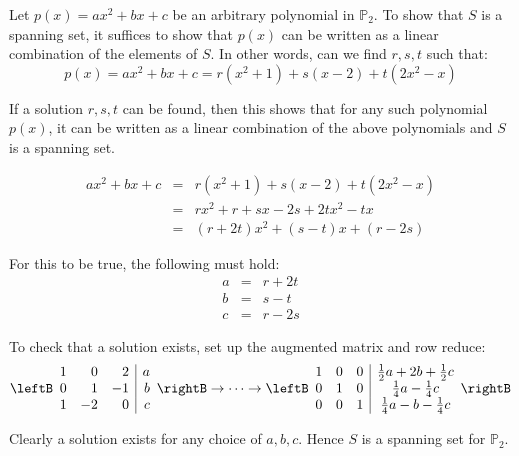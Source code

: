 \begin{solution}
Let $p(x)= ax^2 + bx + c$ be an arbitrary polynomial in $\mathbb{P}_2$. To show that $S$ is a spanning set, it suffices to show that $p(x)$ can be written as a linear combination of the elements of $S$. In other words, can we find $r,s,t$ such that:
\[
p(x) =  ax^2 +bx + c = r(x^2 + 1) + s(x -2) + t(2x^2 - x)
\]

If a solution $r,s,t$ can be found, then this shows that for any such polynomial $p(x)$, it can be written as a linear combination of the above polynomials and $S$ is a spanning set. 

\begin{eqnarray*}
ax^2 +bx + c &=& r(x^2 + 1) + s(x -2) + t(2x^2 - x) \\
&=& rx^2 + r + sx - 2s + 2tx^2 - tx \\
&=& (r+2t)x^2 + (s-t)x +  (r-2s) 
\end{eqnarray*}

For this to be true, the following must hold:
\begin{eqnarray*}
a &=& r+2t \\
b &=& s-t \\
c &=& r-2s
\end{eqnarray*}

To check that a solution exists, set up the augmented matrix and row reduce:
\[
\leftB \begin{array}{rrr|r}
1 & 0 & 2 & a \\
0 & 1 & -1 & b \\
1 & -2 & 0 & c 
\end{array} \rightB \rightarrow \cdots \rightarrow 
\leftB \begin{array}{rrr|c} 
1 & 0 & 0 & \frac{1}{2} a + 2b + \frac{1}{2}c\\
0 & 1 & 0 & \frac{1}{4}a - \frac{1}{4}c \\
0 & 0 & 1 & \frac{1}{4}a - b - \frac{1}{4}c 
\end{array} \rightB
\]

Clearly a solution exists for any choice of $a,b,c$. Hence $S$ is a spanning set for $\mathbb{P}_2$. 
\end{solution}
